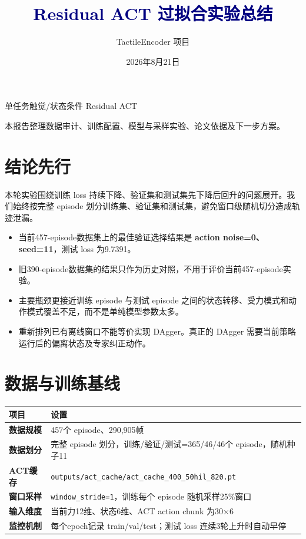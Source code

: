 \documentclass[UTF8,a4paper,11pt,fontset=none]{ctexart}
\title{\textcolor{navy}{Residual ACT 过拟合实验总结}}
\author{TactileEncoder 项目}
\date{2026年8月21日}
\begin{document}
\maketitle
\thispagestyle{empty}
\begin{center}
\vspace{1em}
\large 单任务触觉/状态条件 Residual ACT\par
\vspace{2em}
\end{center}
\vfill
\begin{center}\small 本报告整理数据审计、训练配置、模型与采样实验、论文依据及下一步方案。\end{center}
\newpage

\section{结论先行}
本轮实验围绕训练 loss 持续下降、验证集和测试集先下降后回升的问题展开。我们始终按完整 episode 划分训练集、验证集和测试集，避免窗口级随机切分造成轨迹泄漏。

\begin{itemize}
  \item 当前457-episode数据集上的最佳验证选择结果是 \textbf{action noise=0、seed=11}，测试 loss 为9.7391。
  \item 旧390-episode数据集的结果只作为历史对照，不用于评价当前457-episode实验。
  \item 主要瓶颈更接近训练 episode 与测试 episode 之间的状态转移、受力模式和动作模式覆盖不足，而不是单纯模型参数太多。
  \item 重新排列已有离线窗口不能等价实现 DAgger。真正的 DAgger 需要当前策略运行后的偏离状态及专家纠正动作。
\end{itemize}

\section{数据与训练基线}
\begin{tabularx}{\textwidth}{>{\bfseries}p{}Y}
\toprule 项目 & 设置 \\
\midrule
数据规模 & 457个 episode、290,905帧 \\
数据划分 & 完整 episode 划分，训练/验证/测试=365/46/46个 episode，随机种子11 \\
ACT缓存 & \texttt{outputs/act\_cache/act\_cache\_400\_50hil\_820.pt} \\
窗口采样 & \texttt{window\_stride=1}，训练每个 episode 随机采样25\%窗口 \\
输入维度 & 当前力12维、状态6维、ACT action chunk 为30$\times$6 \\
监控机制 & 每个epoch记录 train/val/test；测试 loss 连续3轮上升时自动早停 \\
\bottomrule
\end{tabularx}
\end{document}
